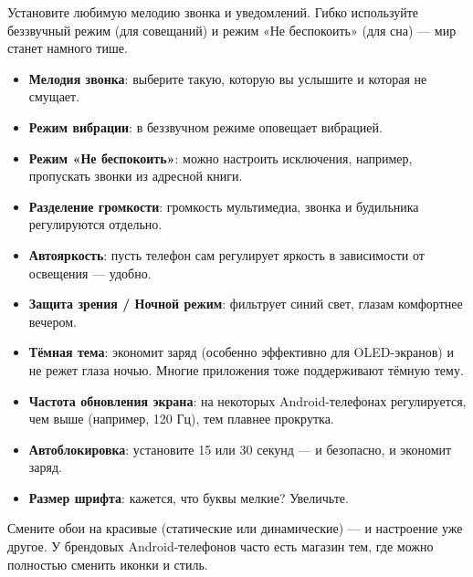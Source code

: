 


Установите любимую мелодию звонка и уведомлений. Гибко используйте беззвучный режим (для совещаний) и режим «Не беспокоить» (для сна) — мир станет намного тише.

\begin{itemize}
  \item \textbf{Мелодия звонка}: выберите такую, которую вы услышите и которая не смущает.
  \item \textbf{Режим вибрации}: в беззвучном режиме оповещает вибрацией.
  \item \textbf{Режим «Не беспокоить»}: можно настроить исключения, например, пропускать звонки из адресной книги.
  \item \textbf{Разделение громкости}: громкость мультимедиа, звонка и будильника регулируются отдельно.
\end{itemize}


\begin{itemize}
  \item \textbf{Автояркость}: пусть телефон сам регулирует яркость в зависимости от освещения — удобно.
  \item \textbf{Защита зрения / Ночной режим}: фильтрует синий свет, глазам комфортнее вечером.
  \item \textbf{Тёмная тема}: экономит заряд (особенно эффективно для OLED-экранов) и не режет глаза ночью. Многие приложения тоже поддерживают тёмную тему.
  \item \textbf{Частота обновления экрана}: на некоторых Android-телефонах регулируется, чем выше (например, 120 Гц), тем плавнее прокрутка.
  \item \textbf{Автоблокировка}: установите 15 или 30 секунд — и безопасно, и экономит заряд.
  \item \textbf{Размер шрифта}: кажется, что буквы мелкие? Увеличьте.
\end{itemize}


Смените обои на красивые (статические или динамические) — и настроение уже другое. У брендовых Android-телефонов часто есть магазин тем, где можно полностью сменить иконки и стиль.

